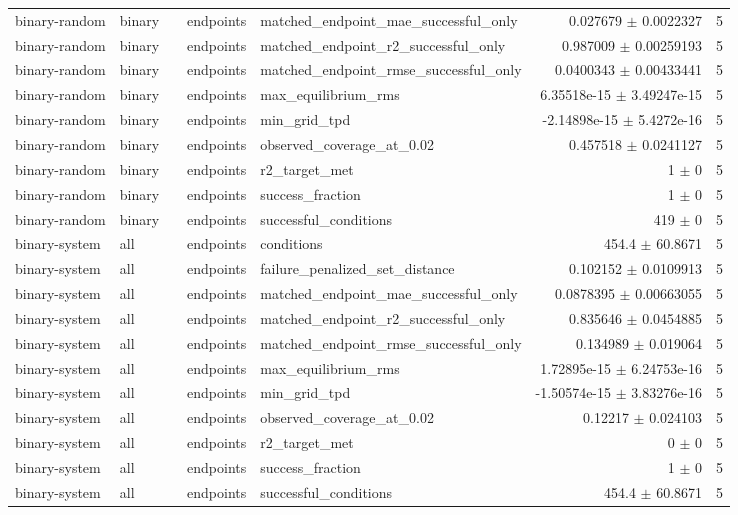 \begin{tabular}{lllllrr}
binary-random & binary &  & endpoints & matched_endpoint_mae_successful_only & 0.027679 $\pm$ 0.0022327 & 5 \\
binary-random & binary &  & endpoints & matched_endpoint_r2_successful_only & 0.987009 $\pm$ 0.00259193 & 5 \\
binary-random & binary &  & endpoints & matched_endpoint_rmse_successful_only & 0.0400343 $\pm$ 0.00433441 & 5 \\
binary-random & binary &  & endpoints & max_equilibrium_rms & 6.35518e-15 $\pm$ 3.49247e-15 & 5 \\
binary-random & binary &  & endpoints & min_grid_tpd & -2.14898e-15 $\pm$ 5.4272e-16 & 5 \\
binary-random & binary &  & endpoints & observed_coverage_at_0.02 & 0.457518 $\pm$ 0.0241127 & 5 \\
binary-random & binary &  & endpoints & r2_target_met & 1 $\pm$ 0 & 5 \\
binary-random & binary &  & endpoints & success_fraction & 1 $\pm$ 0 & 5 \\
binary-random & binary &  & endpoints & successful_conditions & 419 $\pm$ 0 & 5 \\
binary-system & all &  & endpoints & conditions & 454.4 $\pm$ 60.8671 & 5 \\
binary-system & all &  & endpoints & failure_penalized_set_distance & 0.102152 $\pm$ 0.0109913 & 5 \\
binary-system & all &  & endpoints & matched_endpoint_mae_successful_only & 0.0878395 $\pm$ 0.00663055 & 5 \\
binary-system & all &  & endpoints & matched_endpoint_r2_successful_only & 0.835646 $\pm$ 0.0454885 & 5 \\
binary-system & all &  & endpoints & matched_endpoint_rmse_successful_only & 0.134989 $\pm$ 0.019064 & 5 \\
binary-system & all &  & endpoints & max_equilibrium_rms & 1.72895e-15 $\pm$ 6.24753e-16 & 5 \\
binary-system & all &  & endpoints & min_grid_tpd & -1.50574e-15 $\pm$ 3.83276e-16 & 5 \\
binary-system & all &  & endpoints & observed_coverage_at_0.02 & 0.12217 $\pm$ 0.024103 & 5 \\
binary-system & all &  & endpoints & r2_target_met & 0 $\pm$ 0 & 5 \\
binary-system & all &  & endpoints & success_fraction & 1 $\pm$ 0 & 5 \\
binary-system & all &  & endpoints & successful_conditions & 454.4 $\pm$ 60.8671 & 5 \\

\end{tabular}
